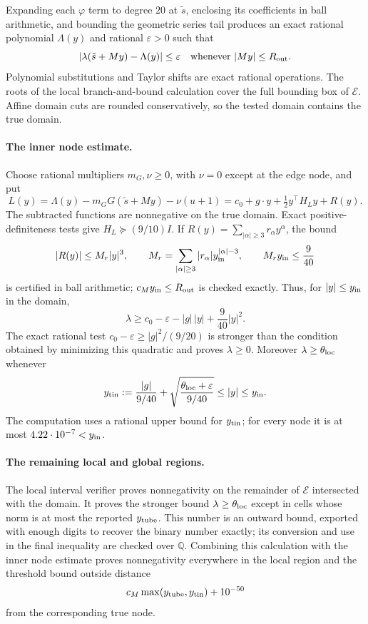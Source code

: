 \documentclass[11pt]{article}
\theoremstyle{definition}
\newcommand{\Q}{\mathbb{Q}}
\begin{document}
Expanding each $\varphi$ term to degree $20$ at $\tilde s$, enclosing its coefficients in ball arithmetic, and bounding
the geometric series tail produces an exact rational polynomial $\Lambda(y)$ and rational $\varepsilon>0$ such that
\[
 |\lambda(\tilde s+My)-\Lambda(y)|\le\varepsilon
 \quad\hbox{whenever }|My|\le R_{\rm out}.
\]
Polynomial substitutions and Taylor shifts are exact rational operations. The roots of the local branch-and-bound
calculation cover the full bounding box of $\mathcal E$. Affine domain cuts are rounded conservatively, so the tested
domain contains the true domain.

\paragraph{The inner node estimate.}
Choose rational multipliers $m_G,\nu\ge0$, with $\nu=0$ except at the edge node, and put
\[
 L(y)=\Lambda(y)-m_G G(\tilde s+My)-\nu(u+1)
     =c_0+g\cdot y+\tfrac12 y^\top H_Ly+R(y).
\]
The subtracted functions are nonnegative on the true domain. Exact positive-definiteness tests give
$H_L\succeq(9/10)I$. If $R(y)=\sum_{|\alpha|\ge3}r_\alpha y^\alpha$, the bound
\[
 |R(y)|\le M_r|y|^3,\qquad
 M_r=\sum_{|\alpha|\ge3}|r_\alpha|y_{\rm in}^{|\alpha|-3},
 \qquad M_r y_{\rm in}\le\frac9{40}
\]
is certified in ball arithmetic; $c_M y_{\rm in}\le R_{\rm out}$ is checked exactly.
Thus, for $|y|\le y_{\rm in}$ in the domain,
\[
 \lambda\ge c_0-\varepsilon-|g|\,|y|+\frac9{40}|y|^2.
\]
The exact rational test
$c_0-\varepsilon\ge |g|^2/(9/20)$ is stronger than the condition obtained by minimizing this quadratic and proves
$\lambda\ge0$. Moreover $\lambda\ge\theta_{\rm loc}$ whenever
\[
 y_{\rm tin}:=\frac{|g|}{9/40}
       +\sqrt{\frac{\theta_{\rm loc}+\varepsilon}{9/40}}
       \le |y|\le y_{\rm in}.
\]
The computation uses a rational upper bound for $y_{\rm tin}$; for every node it is at most
$4.22\cdot10^{-7}<y_{\rm in}$.

\paragraph{The remaining local and global regions.}
The local interval verifier proves nonnegativity on the remainder of $\mathcal E$ intersected with the domain.
It proves the stronger bound $\lambda\ge\theta_{\rm loc}$ except in cells whose norm is at most the reported
$y_{\rm tube}$. This number is an outward bound, exported with enough digits to recover the binary number exactly;
its conversion and use in the final inequality are checked over $\Q$.
Combining this calculation with the inner node estimate proves nonnegativity everywhere in the local region and
the threshold bound outside distance
\[
 c_M\max(y_{\rm tube},y_{\rm tin})+10^{-50}
\]
from the corresponding true node.
\end{document}
